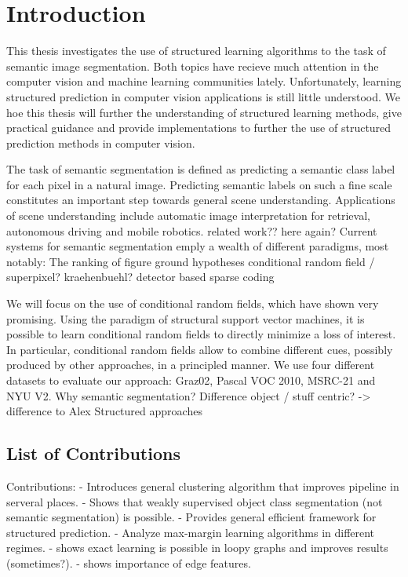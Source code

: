 \chapter{Introduction}
This thesis investigates the use of structured learning algorithms to the task
of semantic image segmentation. Both topics have recieve much attention in the
computer vision and machine learning communities lately. Unfortunately,
learning structured prediction in computer vision applications is still little
understood.  We hoe this thesis will further the understanding of structured
learning methods, give practical guidance and provide implementations to
further the use of structured prediction methods in computer vision.

The task of semantic segmentation is defined as predicting a semantic class label
for each pixel in a natural image. Predicting semantic labels on such a fine scale
constitutes an important step towards general scene understanding.
%
Applications of scene understanding include automatic image interpretation for retrieval,
 autonomous driving and mobile robotics.
%
related work?? here again?
Current systems for semantic segmentation emply a wealth of different paradigms, most notably:
The ranking of figure ground hypotheses
conditional random field / superpixel? kraehenbuehl?
detector based
sparse coding

We will focus on the use of conditional random fields, which have shown very
promising.  Using the paradigm of structural support vector machines, it is
possible to learn conditional random fields to directly minimize a loss of
interest. In particular, conditional random fields allow to combine different
cues, possibly produced by other approaches, in a principled manner.
%
We use four different datasets to evaluate our approach: Graz02, Pascal VOC
2010, MSRC-21 and NYU V2.
%
Why semantic segmentation? Difference object / stuff centric? -> difference to Alex
Structured approaches
%

\section{List of Contributions}
Contributions:
- Introduces general clustering algorithm that improves pipeline in serveral places.
- Shows that weakly supervised object class segmentation (not semantic segmentation) is possible.
- Provides general efficient framework for structured prediction.
- Analyze max-margin learning algorithms in different regimes.
- shows exact learning is possible in loopy graphs and improves results (sometimes?).
- shows importance of edge features.

